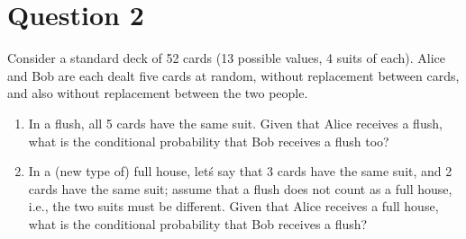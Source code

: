 \documentclass[a4paper, 11pt]{article}
\begin{document}
\section*{Question 2}
Consider a standard deck of 52 cards (13 possible values, 4 suits of each).  Alice and Bob
are each dealt five cards at random, without replacement between cards, and also without
replacement between the two people.
\begin{enumerate}[label=(\alph*)]
    \item In a flush, all 5 cards have the same suit. Given that Alice receives a flush, what is the conditional
          probability that Bob receives a flush too?
    \item In a (new type of) full house, let\'s say that 3 cards have the same suit, and 2 cards have
          the same suit; assume that a flush does not count as a full house, i.e., the two suits must be
          different. Given that Alice receives a full house, what is the conditional probability that Bob
          receives a flush?
\end{enumerate}
\end{document}
